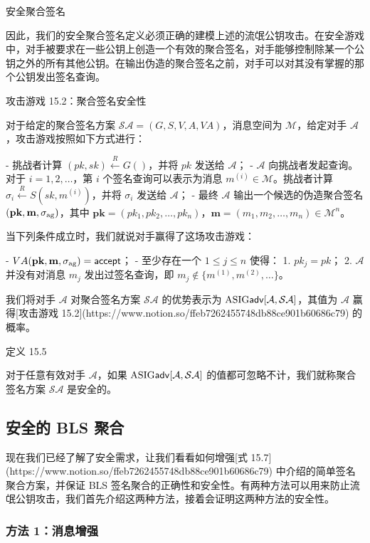 安全聚合签名

因此，我们的安全聚合签名定义必须正确的建模上述的流氓公钥攻击。在安全游戏中，对手被要求在一些公钥上创造一个有效的聚合签名，对手能够控制除某一个公钥之外的所有其他公钥。在输出伪造的聚合签名之前，对手可以对其没有掌握的那个公钥发出签名查询。

攻击游戏 15.2：聚合签名安全性

对于给定的聚合签名方案 $\mathcal{SA}=(G,S,V,A,VA)$，消息空间为 $\mathcal{M}$，给定对手 $\mathcal{A}$，攻击游戏按照如下方式进行：

- 挑战者计算 $(pk,sk)\overset{R}\leftarrow G()$，并将 $pk$ 发送给 $\mathcal{A}$；
- $\mathcal{A}$ 向挑战者发起查询。对于 $i=1,2,\dots$，第 $i$ 个签名查询可以表示为消息 $m^{(i)}\in\mathcal{M}$。挑战者计算 $\sigma_{i}\overset{R}\leftarrow S(sk,m^{(i)})$，并将 $\sigma_i$ 发送给 $\mathcal{A}$；
- 最终 $\mathcal{A}$ 输出一个候选的伪造聚合签名 $(\mathbf{pk},\mathbf{m},\sigma_{\rm ag})$，其中 $\mathbf{pk}=(pk_1, pk_2, \dots, pk_n)$，$\mathbf{m}=(m_1,m_2,\dots,m_n)\in\mathcal{M}^n$。

当下列条件成立时，我们就说对手赢得了这场攻击游戏：

- $VA(\mathbf{pk},\mathbf{m},\sigma_{\rm ag})=\mathsf{accept}$；
- 至少存在一个 $1\leq j \leq n$ 使得：
    1. $pk_j=pk$；
    2. $\mathcal{A}$ 并没有对消息 $m_j$ 发出过签名查询，即 $m_j \notin \{m^{(1)},m^{(2)},\dots\}$。

我们将对手 $\mathcal{A}$ 对聚合签名方案 $\mathcal{SA}$ 的优势表示为 $\rm{ASIG\mathsf{adv}}[\mathcal{A},\mathcal{SA}]$，其值为 $\mathcal{A}$ 赢得[攻击游戏 15.2](https://www.notion.so/ffeb7262455748db88ce901b60686c79) 的概率。

定义 15.5

对于任意有效对手 $\mathcal{A}$，如果 $\rm{ASIG\mathsf{adv}}[\mathcal{A},\mathcal{SA}]$ 的值都可忽略不计，我们就称聚合签名方案 $\mathcal{SA}$ 是安全的。

\subsection{安全的 BLS 聚合}\label{subsec:15-5-3}

现在我们已经了解了安全需求，让我们看看如何增强[式 15.7](https://www.notion.so/ffeb7262455748db88ce901b60686c79) 中介绍的简单签名聚合方案，并保证 BLS 签名聚合的正确性和安全性。有两种方法可以用来防止流氓公钥攻击，我们首先介绍这两种方法，接着会证明这两种方法的安全性。

\subsubsection{方法 1：消息增强}

